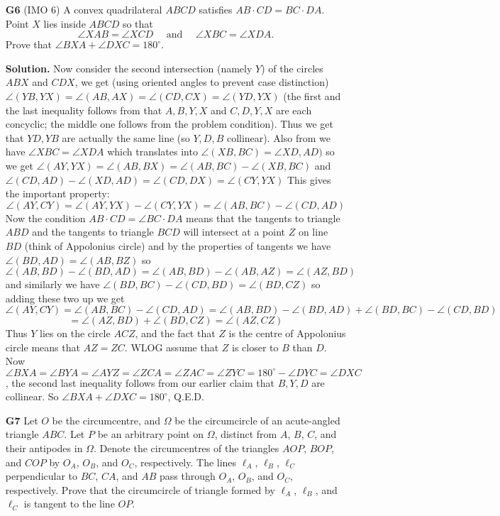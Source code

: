 \documentclass[11pt,a4paper]{article}
\begin{document}
\begin{enumerate}
	\item[\textbf{G6}] (IMO 6) A convex quadrilateral $ABCD$ satisfies $AB\cdot CD = BC\cdot DA$. Point $X$ lies inside $ABCD$ so that \[\angle{XAB} = \angle{XCD}\quad\,\,\text{and}\quad\,\,\angle{XBC} = \angle{XDA}.\]Prove that $\angle{BXA} + \angle{DXC} = 180^\circ$.
	
	\textbf{Solution.} Now consider the second intersection (namely $Y$) of the circles $ABX$ and $CDX$, we get (using oriented angles to prevent case distinction) $\angle(YB, YX)=\angle (AB, AX)=\angle (CD, CX)=\angle (YD, YX)$ (the first and the last inequality follows from that $A, B, Y, X$ and $C, D, Y, X$ are each concyclic; the middle one follows from the problem condition). Thus we get that $YD, YB$ are actually the same line (so $Y, D, B$ collinear). Also from we have $\angle XBC=\angle XDA$ which translates into $\angle(XB, BC)=\angle XD, AD)$ so we get $\angle (AY, YX)=\angle (AB, BX)=\angle (AB, BC)-\angle(XB, BC)$ and $\angle (CD, AD)-\angle (XD, AD)=\angle (CD, DX)=\angle (CY, YX)$ This gives the important property:
	\[\angle (AY, CY)=\angle(AY, YX)-\angle (CY, YX)=\angle (AB, BC)-\angle (CD, AD)\]Now the condition $AB\cdot CD=\angle BC\cdot DA$ means that the tangents to triangle $ABD$ and the tangents to triangle $BCD$ will intersect at a point $Z$ on line $BD$ (think of Appolonius circle) and by the properties of tangents we have $\angle(BD, AD)=\angle (AB, BZ)$ so $\angle (AB, BD)-\angle (BD, AD)=\angle(AB, BD)-\angle(AB, AZ)=\angle (AZ, BD)$ and similarly we have $\angle (BD, BC)-\angle (CD, BD)=\angle (BD, CZ)$ so adding these two up we get
	\[\angle (AY, CY)=\angle (AB, BC)-\angle (CD, AD) = \angle (AB, BD)-\angle (BD, AD) + \angle (BD, BC)-\angle (CD, BD) 
	\]\[
	= \angle (AZ, BD) + \angle (BD, CZ) = \angle (AZ, CZ)\]
	Thus $Y$ lies on the circle $ACZ$, and the fact that $Z$ is the centre of Appolonius circle means that $AZ=ZC$. WLOG assume that $Z$ is closer to $B$ than $D$. Now $\angle BXA=\angle BYA=\angle AYZ=\angle ZCA=\angle ZAC=\angle ZYC=180^{\circ}-\angle DYC=\angle DXC$, the second last inequality follows from our earlier claim that $B, Y, D$ are collinear. So $\angle BXA+\angle DXC=180^{\circ}$, Q.E.D.
	
	\item[\textbf{G7}] Let $O$ be the circumcentre, and $\Omega$ be the circumcircle of an acute-angled triangle $ABC$. Let $P$ be an arbitrary point on $\Omega$, distinct from $A$, $B$, $C$, and their antipodes in $\Omega$. Denote the circumcentres of the triangles $AOP$, $BOP$, and $COP$ by $O_A$, $O_B$, and $O_C$, respectively. The lines $\ell_A$, $\ell_B$, $\ell_C$ perpendicular to $BC$, $CA$, and $AB$ pass through $O_A$, $O_B$, and $O_C$, respectively. Prove that the circumcircle of triangle formed by $\ell_A$, $\ell_B$, and $\ell_C$ is tangent to the line $OP$.
	

\end{enumerate}
\end{document}
